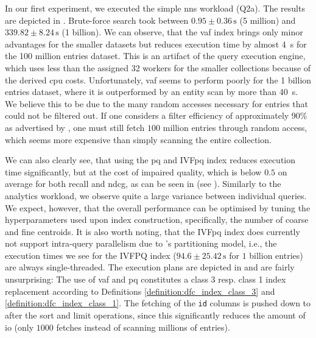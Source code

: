 In our first experiment, we executed the simple \acrshort{nns} workload (Q2a). The results are depicted in . Brute-force search took between $0.95 \pm 0.36 \, \si{\second}$ (5 million) and $339.82 \pm 8.24 \, \si{\second}$ (1 billion). We can observe, that the \acrshort{vaf} index brings only minor advantages for the smaller datasets but reduces execution time by almost \SI{4}{\second} for the 100 million entries dataset. This is an artifact of the query execution engine, which uses less than the assigned 32 workers for the smaller collections because of the derived \acrshort{cpu} costs. Unfortunately, \acrshort{vaf} seems to perform poorly for the 1 billion entries dataset, where it is outperformed by an entity scan by more than \SI{40}{\second}. We believe this to be due to the many random accesses necessary for entries that could not be filtered out. If one considers a filter efficiency of approximately 90\% as advertised by \cite{Weber:1998Va}, one must still fetch $100$ million entries through random access, which seems more expensive than simply scanning the entire collection.

We can also clearly see, that using the \acrshort{pq} and IVF\acrshort{pq} index reduces execution time significantly, but at the cost of impaired quality, which is below $0.5$ on average for both recall and \acrshort{ndcg}, as can be seen in  (see ). Similarly to the analytics workload, we observe quite a large variance between individual queries. We expect, however, that the overall performance can be optimised by tuning the hyperparameters used upon index construction, specifically, the number of coarse and fine centroids. It is also worth noting, that the IVF\acrshort{pq} index does currently not support intra-query parallelism due to \cottontail{}'s partitioning model, i.e., the execution times we see for the IVFPQ index ($94.6 \pm 25.42 \, \si{\second}$ for $1$ billion entries) are always single-threaded. The execution plans are depicted in  and are fairly unsurprising: The use of \acrshort{vaf} and \acrshort{pq} constitutes a class 3 resp. class 1 index replacement according to Definitions \ref{definition:dfc_index_class_3} and \ref{definition:dfc_index_class_1}. The fetching of the \texttt{id} columns is pushed down to after the sort and limit operations, since this significantly reduces the amount of \acrshort{io} (only $1000$ fetches instead of scanning millions of entries).

